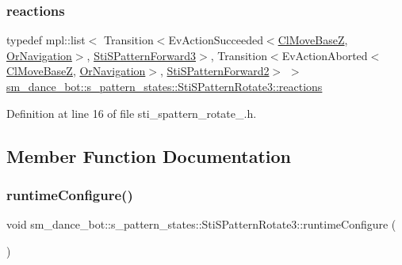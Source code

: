 \subsubsection{\texorpdfstring{reactions}{reactions}}
{\footnotesize\ttfamily typedef mpl\+::list$<$ Transition$<$Ev\+Action\+Succeeded$<$\hyperlink{classmove__base__z__client_1_1ClMoveBaseZ}{Cl\+Move\+BaseZ}, \hyperlink{classsm__dance__bot_1_1OrNavigation}{Or\+Navigation}$>$, \hyperlink{structsm__dance__bot_1_1s__pattern__states_1_1StiSPatternForward3}{Sti\+S\+Pattern\+Forward3}$>$, Transition$<$Ev\+Action\+Aborted$<$\hyperlink{classmove__base__z__client_1_1ClMoveBaseZ}{Cl\+Move\+BaseZ}, \hyperlink{classsm__dance__bot_1_1OrNavigation}{Or\+Navigation}$>$, \hyperlink{structsm__dance__bot_1_1s__pattern__states_1_1StiSPatternForward2}{Sti\+S\+Pattern\+Forward2}$>$ $>$ \hyperlink{structsm__dance__bot_1_1s__pattern__states_1_1StiSPatternRotate3_a8f8dc6114070de47e9c2eedbb9f3ccb7}{sm\+\_\+dance\+\_\+bot\+::s\+\_\+pattern\+\_\+states\+::\+Sti\+S\+Pattern\+Rotate3\+::reactions}}



Definition at line 16 of file sti\+\_\+spattern\+\_\+rotate\+\_.\+h.



\subsection{Member Function Documentation}
\mbox{\label{structsm__dance__bot_1_1s__pattern__states_1_1StiSPatternRotate3_a7c594e66c0b34e5857a62b1d95d06fbd}} 
\subsubsection{\texorpdfstring{runtime\+Configure()}{runtimeConfigure()}}
{\footnotesize\ttfamily void sm\+\_\+dance\+\_\+bot\+::s\+\_\+pattern\+\_\+states\+::\+Sti\+S\+Pattern\+Rotate3\+::runtime\+Configure (\begin{DoxyParamCaption}{ }\end{DoxyParamCaption})\hspace{0.3cm}{\ttfamily [inline]}}



